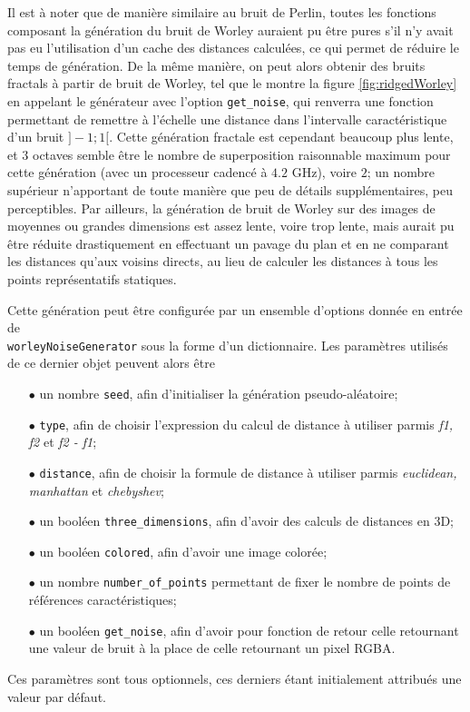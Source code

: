 \documentclass[11pt]{article}
\begin{document}
Il est à noter que de manière similaire au bruit de Perlin, toutes les fonctions composant la génération du bruit de Worley auraient pu être pures s'il n'y avait pas eu l'utilisation d'un cache des distances calculées, ce qui permet de réduire le temps de génération. De la même manière, on peut alors obtenir des bruits fractals à partir de bruit de Worley, tel que le montre la figure \ref{fig:ridgedWorley} en appelant le générateur avec l'option \texttt{get\_noise}, qui renverra une fonction permettant de remettre à l'échelle une distance dans l'intervalle caractéristique d'un bruit $]-1;1[$. Cette génération fractale est cependant beaucoup plus lente, et $3$ octaves semble être le nombre de superposition raisonnable maximum pour cette génération (avec un processeur cadencé à $4.2$ GHz), voire $2$; un nombre supérieur n'apportant de toute manière que peu de détails supplémentaires, peu perceptibles. Par ailleurs, la génération de bruit de Worley sur des images de moyennes ou grandes dimensions est assez lente, voire trop lente, mais aurait pu être réduite drastiquement en effectuant un pavage du plan et en ne comparant les distances qu'aux voisins directs, au lieu de calculer les distances à tous les points représentatifs statiques. \cite{worleyNoise}

Cette génération peut être configurée par un ensemble d'options donnée en entrée de\\ \texttt{worleyNoiseGenerator} sous la forme d'un dictionnaire. Les paramètres utilisés de ce dernier objet peuvent alors être
\begin{itemize}
    \item [$\bullet$] un nombre \texttt{seed}, afin d'initialiser la génération pseudo-aléatoire;
    \item [$\bullet$] \texttt{type}, afin de choisir l'expression du calcul de distance à utiliser parmis \textit{f1, f2} et \textit{f2 - f1};
    \item [$\bullet$] \texttt{distance}, afin de choisir la formule de distance à utiliser parmis \textit{euclidean, manhattan} et \textit{chebyshev};
    \item [$\bullet$] un booléen \texttt{three\_dimensions}, afin d'avoir des calculs de distances en 3D;
    \item [$\bullet$] un booléen \texttt{colored}, afin d'avoir une image colorée;
    \item [$\bullet$] un nombre \texttt{number\_of\_points} permettant de fixer le nombre de points de références caractéristiques;
    \item [$\bullet$] un booléen \texttt{get\_noise}, afin d'avoir pour fonction de retour celle retournant une valeur de bruit à la place de celle retournant un pixel RGBA.
\end{itemize}
Ces paramètres sont tous optionnels, ces derniers étant initialement attribués une valeur par défaut.
\end{document}
